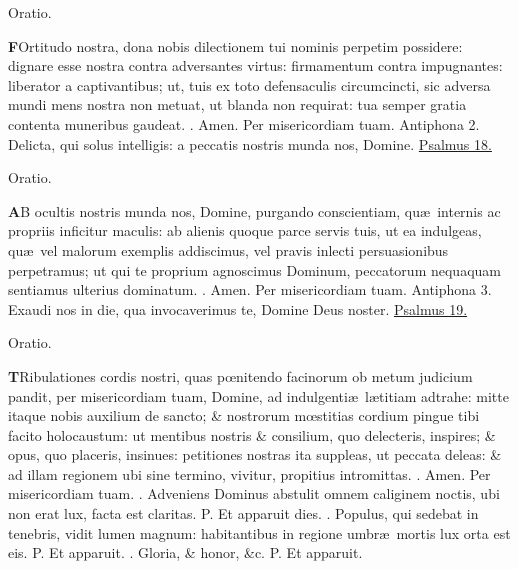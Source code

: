 \documentclass[letter,11pt]{book}
\makeatletter
\DeclareRobustCommand{\Vbar}{\vers@resp{-0.1em}{V}}
\DeclareRobustCommand{\Rbar}{\vers@resp{0pt}{R}}
\newcommand{\vers@resp@sym}{\raisebox{0.2ex}{\rotatebox[origin=c]{-20}{$\m@th\rceil$}}}
\newcommand{\vers@resp}[2]{%
  {\ooalign{\hidewidth\kern#1\vers@resp@sym\hidewidth\cr#2\cr}}%
}%
\def\P{\color{Red} P. \color{black}}
\def\V{\color{Red} \Vbar . \color{black}}
\def\R{\color{Red} \Rbar . \color{black}}
\makeatother
\begin{document}
\begin{multicols*}{2}
\vspace{-.5em} \begin{center} \color{Red} Oratio. \color{black} \end{center} \vspace{-.5em}
\lettrine[lines=2]{\bfseries \color{Red} F}{}Ortitudo nostra, dona nobis dilectionem tui nominis perpetim possidere: dignare esse nostra contra adversantes virtus: firmamentum contra impugnantes: liberator a captivantibus; ut, tuis ex toto defensaculis circumcincti, sic adversa mundi mens nostra non metuat, ut blanda non requirat: tua semper gratia contenta muneribus gaudeat. \R Amen. Per misericordiam tuam.
\newline \color{Red} Antiphona 2. \color{black} Delicta, qui solus intelligis: a peccatis nostris munda nos, Domine. \color{Red} \hyperlink{ps18}{Psalmus 18.} \color{black}
\vspace{-.5em} \begin{center} \color{Red} Oratio. \color{black} \end{center} \vspace{-.5em}
\lettrine[lines=2]{\bfseries \color{Red} A}{}B ocultis nostris munda nos, Domine, purgando conscientiam, qu\ae \ internis ac propriis inficitur maculis: ab alienis quoque parce servis tuis, ut ea indulgeas, qu\ae \ vel malorum exemplis addiscimus, vel pravis inlecti persuasionibus perpetramus; ut qui te proprium agnoscimus Dominum, peccatorum nequaquam sentiamus ulterius dominatum. \R Amen. Per misericordiam tuam.
\newline \color{Red} Antiphona 3. \color{black} Exaudi nos in die, qua invocaverimus te, Domine Deus noster. \color{Red} \hyperlink{ps19}{Psalmus 19.} \color{black}
\vspace{-.5em} \begin{center} \color{Red} Oratio. \color{black} \end{center} \vspace{-.5em}
\lettrine[lines=2]{\bfseries \color{Red} T}{}Ribulationes cordis nostri, quas p\oe nitendo facinorum ob metum judicium pandit, per misericordiam tuam, Domine, ad indulgenti\ae \ l\ae titiam adtrahe: mitte itaque nobis auxilium de sancto; \& nostrorum m\oe stitias cordium pingue tibi facito holocaustum: ut mentibus nostris \& consilium, quo delecteris, inspires; \& opus, quo placeris, insinues: petitiones nostras ita suppleas, ut peccata deleas: \& ad illam regionem ubi sine termino, vivitur, propitius intromittas. \R Amen. Per misericordiam tuam.
\newline \R Adveniens Dominus abstulit omnem caliginem noctis, ubi non erat lux, facta est claritas. \P Et apparuit dies. \V Populus, qui sedebat in tenebris, vidit lumen magnum: habitantibus in regione umbr\ae \ mortis lux orta est eis. \P Et apparuit. \V Gloria, \& honor, \&c. \P Et apparuit.

\end{multicols*}
\end{document}
